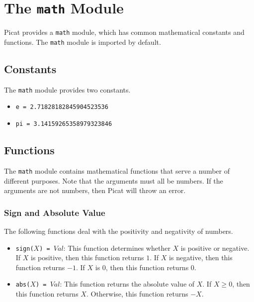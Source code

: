 \appendix
\chapter{The \texttt{math} Module}\label{chapter:math}
Picat provides a \texttt{math} module, which has common mathematical constants and functions.  The \texttt{math} module is imported by default.


\section{Constants}
The \texttt{math} module provides two constants.
\begin{itemize}
\item \texttt{e = 2.71828182845904523536}
\item \texttt{pi = 3.14159265358979323846}
\end{itemize}

\section{Functions}
The \texttt{math} module contains mathematical functions that serve a number of different purposes.  Note that the arguments must all be numbers.  If the arguments are not numbers, then Picat will throw an error.

\subsection{Sign and Absolute Value}
The following functions deal with the positivity and negativity of numbers.
\begin{itemize}
\item \texttt{sign($X$) = $Val$}: This function determines whether $X$ is positive or negative.  If $X$ is positive, then this function returns $1$.  If $X$ is negative, then this function returns $-1$.  If $X$ is $0$, then this function returns $0$.
\item \texttt{abs($X$) = $Val$}: This function returns the absolute value of $X$.  If $X \ge 0$, then this function returns $X$.  Otherwise, this function returns $-X$.
\end{itemize}

